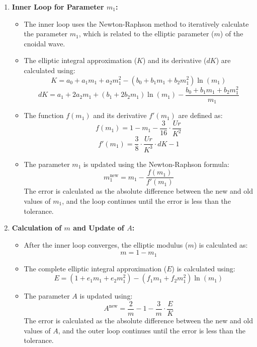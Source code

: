\documentclass[a4paper]{article}
\begin{document}
\begin{enumerate}
    \item \textbf{Inner Loop for Parameter \(m_1\):}
    \begin{itemize}
        \item The inner loop uses the Newton-Raphson method to iteratively calculate the parameter \(m_1\), which is related to the elliptic parameter (\(m\)) of the cnoidal wave.
        
        \item The elliptic integral approximation (\(K\)) and its derivative (\(dK\)) are calculated using:
        \[
        K = a_0 + a_1 m_1 + a_2 m_1^2 - (b_0 + b_1 m_1 + b_2 m_1^2) \ln(m_1)
        \]
        \[
        dK = a_1 + 2 a_2 m_1 + (b_1 + 2 b_2 m_1) \ln(m_1) - \frac{b_0 + b_1 m_1 + b_2 m_1^2}{m_1}
        \]

        \item The function \(f(m_1)\) and its derivative \(f'(m_1)\) are defined as:
        \[
        f(m_1) = 1 - m_1 - \frac{3}{16} \cdot \frac{Ur}{K^2}
        \]
        \[
        f'(m_1) = \frac{3}{8} \cdot \frac{Ur}{K^3} \cdot dK - 1
        \]
        
        \item The parameter \(m_1\) is updated using the Newton-Raphson formula:
        \[
        m_1^{\text{new}} = m_1 - \frac{f(m_1)}{f'(m_1)}
        \]
        The error is calculated as the absolute difference between the new and old values of \(m_1\), and the loop continues until the error is less than the tolerance.
    \end{itemize}
    \vspace{1.5cm}

    \item \textbf{Calculation of \(m\) and Update of \(A\):}
    \begin{itemize}
        \item After the inner loop converges, the elliptic modulus (\(m\)) is calculated as:
        \[
        m = 1 - m_1
        \]
        \item The complete elliptic integral approximation (\(E\)) is calculated using:
        \[
        E = (1 + e_1 m_1 + e_2 m_1^2) - (f_1 m_1 + f_2 m_1^2) \ln(m_1)
        \]
        \item The parameter \(A\) is updated using:
        \[
        A^{\text{new}} = \frac{2}{m} - 1 - \frac{3}{m} \cdot \frac{E}{K}
        \]
        The error is calculated as the absolute difference between the new and old values of \(A\), and the outer loop continues until the error is less than the tolerance.
    \end{itemize}


\end{enumerate}
\end{document}
